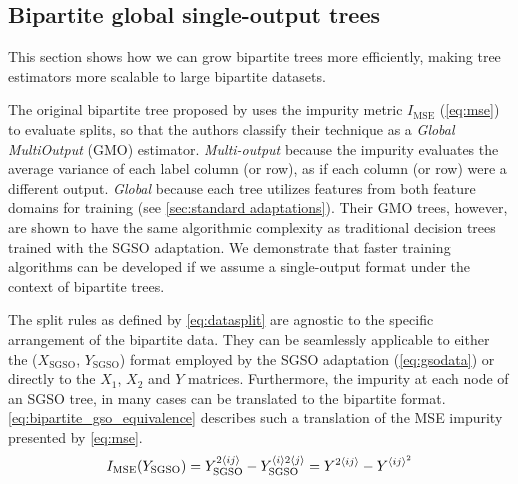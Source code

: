 
\subsection{Bipartite global single-output trees}
\label{sec:bgso_trees}

This section shows how we can grow bipartite trees more efficiently, making tree estimators more scalable to large bipartite datasets.

The original bipartite tree proposed by  uses the impurity metric $I_\text{MSE}$ (\autoref{eq:mse}) to evaluate splits, so that the authors classify their technique as a \emph{Global MultiOutput} (GMO) estimator. \emph{Multi-output} because the impurity evaluates the average variance of each label column (or row), as if each column (or row) were a different output. \emph{Global} because each tree utilizes features from both feature domains for training (see \autoref{sec:standard adaptations}).
Their GMO trees, however, are shown to have the same algorithmic complexity as traditional decision trees trained with the SGSO adaptation. We demonstrate that faster training algorithms can be developed if we assume a single-output format under the context of bipartite trees. %

The split rules as defined by \autoref{eq:datasplit} are agnostic to the specific arrangement of the bipartite data. They can be seamlessly applicable to either the ($X_\text{SGSO}$, $Y_\text{SGSO}$) format employed by the SGSO adaptation (\autoref{eq:gsodata}) or directly to the $X_1$, $X_2$ and $Y$ matrices.
Furthermore, the impurity at each node of an SGSO tree,
in many cases can be translated to the bipartite format. \autoref{eq:bipartite_gso_equivalence} describes such a translation of the MSE impurity presented by \autoref{eq:mse}.
%
\begin{equation}
    I_\text{MSE}(Y_\text{SGSO})
        = Y_\text{SGSO}^{2\langle ij\rangle} - Y_\text{SGSO}^{\langle i\rangle 2 \langle j\rangle}
        = Y^{2\langle ij\rangle} - Y^{\langle ij\rangle^2}
    \label{eq:bipartite_gso_equivalence}
\end{equation}
 
